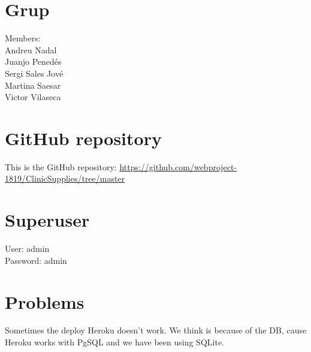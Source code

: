 \documentclass{article}
\begin{document}
\section{Grup}
Members:\\
Andreu Nadal\\
Juanjo Penedés\\
Sergi Sales Jové\\
Martina Saesar\\
Victor Vilaseca\\

\section{GitHub repository}
This is the GitHub repository: \href{https://github.com/webproject-1819/ClinicSupplies/tree/master}{https://github.com/webproject-1819/ClinicSupplies/tree/master}

\section{Superuser}
User: admin\\
Password: admin

\section{Problems}
Sometimes the deploy Heroku doesn't work. We think is because of the DB, cause Heroku works with PgSQL and we have been using SQLite. 
\end{document}
